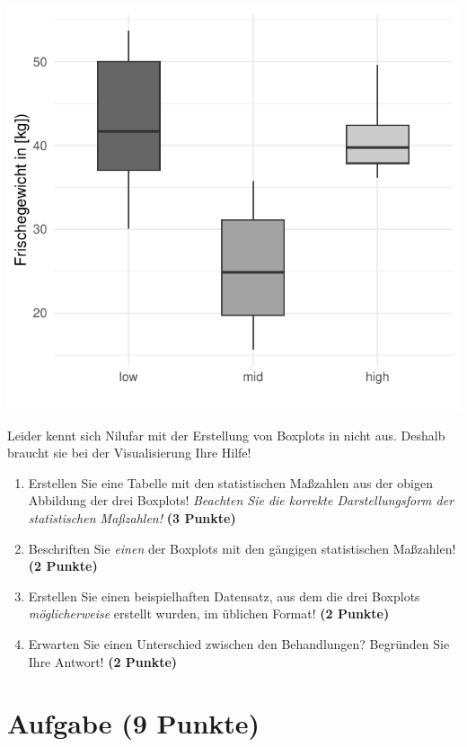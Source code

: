 \documentclass[a4paper, 9pt]{scrartcl}\usepackage[]{graphicx}\usepackage[]{xcolor}
\makeatletter
\def\maxwidth{ %
  \ifdim\Gin@nat@width>\linewidth
    \linewidth
  \else
    \Gin@nat@width
  \fi
}
\makeatother
\begin{document}
{\centering \includegraphics[width=\maxwidth]{img/boxplot-02-zer-1} 

}




Leider kennt sich Nilufar mit der Erstellung von Boxplots in \Rlogo nicht aus. Deshalb braucht sie bei der Visualisierung Ihre Hilfe!

\begin{enumerate}
\item Erstellen Sie eine Tabelle mit den statistischen Maßzahlen aus der
  obigen Abbildung der drei Boxplots! \textit{Beachten Sie die korrekte
    Darstellungsform der statistischen Maßzahlen!} \textbf{(3 Punkte)}
\item Beschriften Sie \textit{einen} der Boxplots mit den gängigen
  statistischen Maßzahlen! \textbf{(2 Punkte)}
\item Erstellen Sie einen beispielhaften Datensatz, aus dem die drei
  Boxplots \textit{möglicherweise} erstellt wurden, im \Rlogo üblichen Format! \textbf{(2 Punkte)}
\item Erwarten Sie einen Unterschied zwischen den Behandlungen? Begründen
  Sie Ihre Antwort! \textbf{(2 Punkte)}
\end{enumerate} 
\clearpage

\section{Aufgabe \hfill (9 Punkte)}
\end{document}
